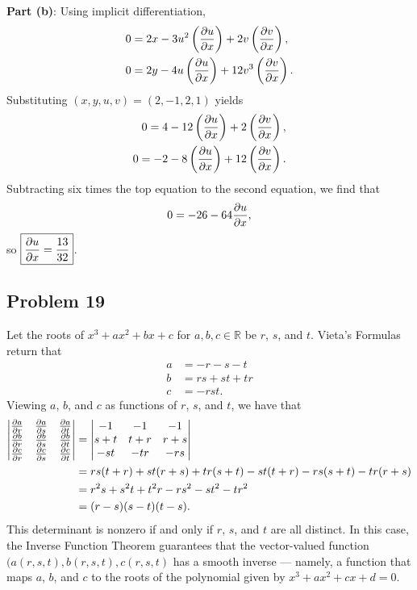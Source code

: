 \documentclass[11pt]{article}
\begin{document}
\textbf{Part (b)}: Using implicit differentiation,
\begin{align*}
	0 &= 2x - 3u^{2} \left( \pdv{u}{x} \right) + 2v \left( \pdv{v}{x} \right), \\
	0 &= 2y - 4u \left( \pdv{u}{x} \right) + 12v^{3} \left( \pdv{v}{x} \right).
\end{align*}
Substituting $(x, y, u, v) = (2, -1, 2, 1)$ yields
\begin{align*}
	0 = 4 - 12 \left( \pdv{u}{x} \right) + 2 \left( \pdv{v}{x} \right), \\
	0 = -2 - 8 \left( \pdv{u}{x} \right) + 12 \left( \pdv{v}{x} \right).
\end{align*}
Subtracting six times the top equation to the second equation, we find that
\[
	0 = -26 - 64 \pdv{u}{x},
\]
so $\boxed{\pdv{u}{x} = \frac{13}{32}}$.


\subsection*{Problem 19}

Let the roots of $x^{3} + ax^{2} + bx + c$ for $a, b, c \in \mathbb{R}$ be $r$, $s$, and $t$. Vieta's Formulas return that
\begin{align*}
	a &= -r - s - t \\
	b &= rs + st + tr \\
	c &= -rst.
\end{align*}
Viewing $a$, $b$, and $c$ as functions of $r$, $s$, and $t$, we have that
\begin{align*}
	\begin{vmatrix} \pdv{a}{r} & \pdv{a}{s} & \pdv{a}{t}  \\ \pdv{b}{r} & \pdv{b}{s} & \pdv{b}{t} \\ \pdv{c}{r} & \pdv{c}{s} & \pdv{c}{t} \end{vmatrix} &= \begin{vmatrix} -1 & -1 & -1 \\ s + t & t + r & r + s \\ -st & -tr & -rs \end{vmatrix} \\
	&= rs(t + r) + st(r + s) + tr(s + t) - st(t + r) - rs(s + t) - tr(r + s) \\
	&= r^{2}s + s^{2}t + t^{2}r - rs^{2} - st^{2} - tr^{2} \\
	&= (r - s)(s - t)(t - s).
\end{align*}
This determinant is nonzero if and only if $r$, $s$, and $t$ are all distinct. In this case, the Inverse Function Theorem guarantees that the vector-valued function $(a(r, s, t), b(r, s, t), c(r, s, t)$ has a smooth inverse --- namely, a function that maps $a$, $b$, and $c$ to the roots of the polynomial given by $x^{3} + ax^{2} + cx + d = 0$.
\end{document}
